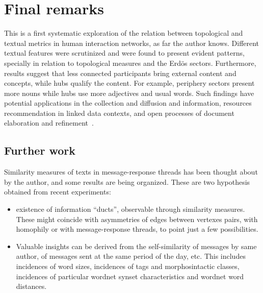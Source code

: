 \documentclass[%
 aip,
 jmp,%
 amsmath,amssymb,
 reprint,%
]{revtex4-1}
\begin{document}
\section{Final remarks}\label{sec:remarks}
This is a first systematic exploration of the relation between topological and textual
metrics in human interaction networks, as far the author knows.
Different textual features were scrutinized and were found to present
evident patterns, specially in relation to topological measures and the Erd\"os sectors.
Furthermore, results suggest that less connected participants bring external content and concepts,
while hubs qualify the content.
For example, periphery sectors present more nouns while hubs use more adjectives and usual words.
Such findings have potential applications in the collection and diffusion and information,
resources recommendation in linked data contexts, and open processes of document elaboration and refinement~\cite{ensaio,OPS,pnud5,evoSN,pbr}.

\subsection{Further work}\label{subsec:fw}

Similarity measures of texts in message-response threads has been thought about by the author, and some results are being organized.
These are two hypothesis obtained from recent experiments:
\begin{itemize}
    \item existence of information ``ducts'', observable through similarity measures. These might coincide with asymmetries of edges between vertexes pairs, with homophily or with message-response threads, to point just a few possibilities.
    \item Valuable insights can be derived from the self-similarity of messages by same author,
	    of messages sent at the same period of the day, etc.
	    This includes incidences of word sizes, incidences of tags and morphosintactic classes,
	    incidences of particular wordnet synset characteristics and wordnet word distances.
\end{itemize}
\end{document}
